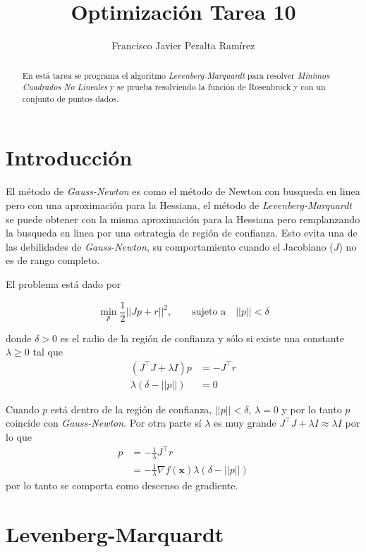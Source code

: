 \documentclass{article}
\title {Optimización Tarea 10}
\author {Francisco Javier Peralta Ramírez}
\begin{document}
\maketitle
\begin{abstract}
  En está tarea se programa el algoritmo \emph{Levenberg-Marquardt} para resolver \emph{Mínimos Cuadrados No Lineales} y se prueba resolviendo la función de Rosenbrock y con un conjunto de puntos dados.
\end{abstract}
\begin{multicols}{2}

\section{Introducción}

El método de \emph{Gauss-Newton} es como el método de Newton con busqueda en linea pero con una aproximación para la Hessiana, el método de \emph{Levenberg-Marquardt} se puede obtener con la misma aproximación para la Hessiana pero remplanzando la busqueda en linea por una estrategia de región de confianza. Esto evita una de las debilidades de \emph{Gauss-Newton}, su comportamiento cuando el Jacobiano ($J$) no es de rango completo.

El problema está dado por

$$\min_p \frac{1}{2}||Jp+r||^2, \qquad \text{sujeto a} \quad ||p|| < \delta$$

donde $\delta > 0$ es el radio de la región de confianza y sólo si existe una constante $\lambda \geq 0$ tal que
\begin{align*}
 (J^\intercal J + \lambda I)p &= -J^\intercal r\\
  \lambda(\delta - ||p||) &= 0
\end{align*}

Cuando $p$ está dentro de la región de confianza, $||p|| < \delta$, $\lambda = 0$ y por lo tanto $p$ coincide con \emph{Gauss-Newton}. Por otra parte sí $\lambda$ es muy grande $J^\intercal J + \lambda I \approx \lambda I$ por lo que
\begin{align*}
 p &= -\frac{1}{\lambda}J^\intercal r\\
 &= -\frac{1}{\lambda}\nabla f(\boldsymbol{x})
  \lambda(\delta - ||p||)
\end{align*}
por lo tanto se comporta como descenso de gradiente.

\section{Levenberg-Marquardt}


\end{multicols}
\end{document}
